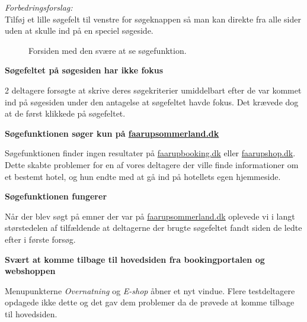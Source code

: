 \documentclass[10pt,a4paper]{article}      %
\newenvironment{forslag}{\emph{Forbedringsforslag:}\\[0.5mm]}{}
\newcommand\pic[1]{\texttt{[image: Pics/\#1]}}
\renewcommand\good{\pic{good}}
\renewcommand\smallproblem{\pic{smallproblem}}
\renewcommand\seriousproblem{\pic{seriousproblem}}
\begin{document}
\begin{kommentarer}
\begin{forslag}
Tilføj et lille søgefelt til venstre for søgeknappen så man kan direkte fra
alle sider uden at skulle ind på en speciel søgeside.
\end{forslag}


\begin{figure}[htbp]
    \centering
    \caption{Forsiden med den svære at se søgefunktion.}
    \label{fig:forside}
\end{figure}

\item[\smallproblem]{\textbf{Søgefeltet på søgesiden har ikke fokus}}

2 deltagere forsøgte at skrive deres søgekriterier umiddelbart efter de var
kommet ind på søgesiden under den antagelse at søgefeltet havde fokus. Det
krævede dog at de først klikkede på søgefeltet.

\item[\seriousproblem]{\textbf{Søgefunktionen søger kun på \url{faarupsommerland.dk}}}

Søgefunktionen finder ingen resultater på \url{faarupbooking.dk}
eller \url{faarupshop.dk}. Dette skabte problemer for en af vores deltagere der ville
finde informationer om et bestemt hotel, og hun endte med at gå ind på hotellets
egen hjemmeside.

\item[\good]{\textbf{Søgefunktionen fungerer}}

Når der blev søgt på emner der var på \url{faarupsommerland.dk} oplevede vi i langt
størstedelen af tilfældende at deltagerne der brugte søgefeltet fandt siden de
ledte efter i første forsøg.

\item[\seriousproblem]{\textbf{Svært at komme tilbage til hovedsiden fra bookingportalen og webshoppen}}

Menupunkterne \emph{Overnatning} og \emph{E-shop} åbner et nyt vindue. Flere testdeltagere
opdagede ikke dette og det gav dem problemer da de prøvede at komme tilbage til hovedsiden.


\end{kommentarer}
\end{document}
